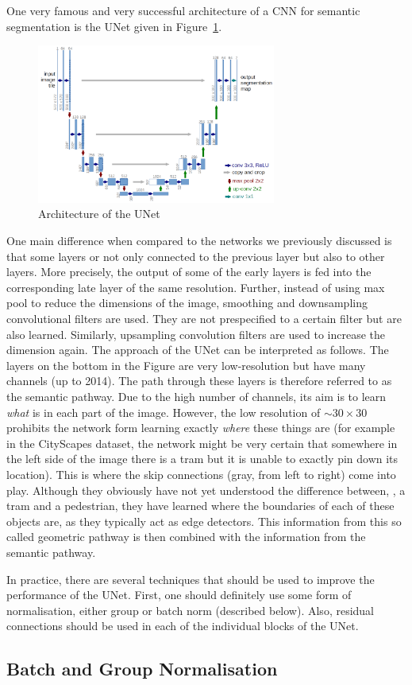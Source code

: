 One very famous and very successful architecture of a CNN for semantic
segmentation is the UNet given in Figure~\ref{fig:unet}.
\begin{figure}[htpb]
  \centering \includegraphics[width=0.7\textwidth]{Figures/unet}%
  \caption{Architecture of the UNet}%
  \label{fig:unet}
\end{figure}
One main difference when compared to the networks we previously discussed is
that some layers or not only connected to the previous layer but also to other
layers. More precisely, the output of some of the early layers is fed into the
corresponding late layer of the same resolution. Further, instead of using max
pool to reduce the dimensions of the image, smoothing and downsampling
convolutional filters are used. They are not prespecified to a certain filter
but are also learned. Similarly, upsampling convolution filters are used to
increase the dimension again. The approach of the UNet can be interpreted as
follows. The layers on the bottom in the Figure are very low-resolution but have
many channels (up to 2014). The path through these layers is therefore referred
to as the semantic pathway. Due to the high number of channels, its aim is to
learn \emph{what} is in each part of the image. However, the low resolution of
$\sim 30 \times 30$ prohibits the network form learning exactly \emph{where}
these things are (for example in the CityScapes dataset, the network might be
very certain that somewhere in the left side of the image there is a tram but it
is unable to exactly pin down its location). This is where the skip connections
(gray, from left to right) come into play. Although they obviously have not yet
understood the difference between, \eg, a tram and a pedestrian, they have
learned where the boundaries of each of these objects are, as they typically act
as edge detectors. This information from this so called geometric pathway is
then combined with the information from the semantic pathway.

In practice, there are several techniques that should be used to improve the
performance of the UNet. First, one should definitely use some form of
normalisation, either group or batch norm (described below). Also, residual
connections should be used in each of the individual blocks of the UNet.

\subsection*{Batch and Group Normalisation}


